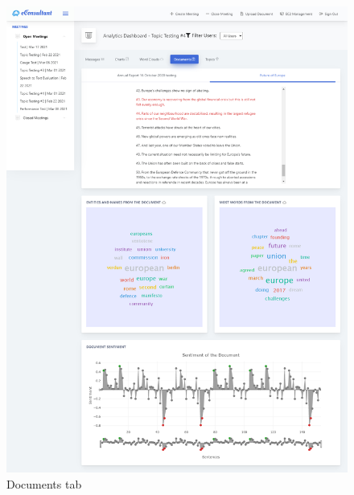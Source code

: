 \documentclass{article}
\begin{document}
\begin{figure}[H]
  \centering
  \includegraphics[scale=0.29]{implementation/documents.jpg}
  \caption{Documents tab}
  \label{fig:documents}
\end{figure}
\end{document}
